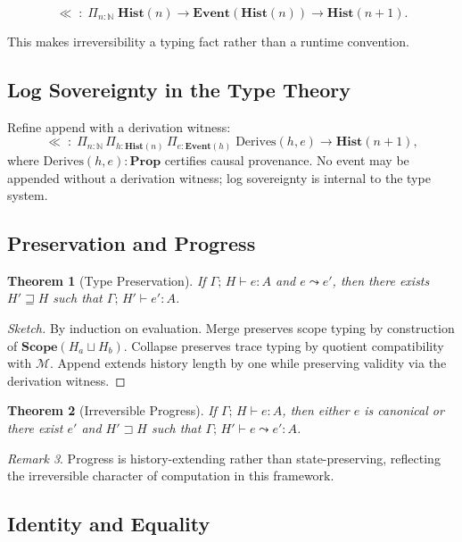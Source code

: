 \documentclass[11pt,a4paper]{article}
\newtheorem{theorem}{Theorem}[section]
\theoremstyle{definition}
\theoremstyle{remark}
\newtheorem{remark}[theorem]{Remark}
\begin{document}
\[
\ll\; :\; \Pi_{n : \mathbb{N}}\; \mathbf{Hist}(n) \to \mathbf{Event}(\mathbf{Hist}(n)) \to \mathbf{Hist}(n+1).
\]

This makes irreversibility a typing fact rather than a runtime convention.

\subsection{Log Sovereignty in the Type Theory}

Refine append with a derivation witness:
\[
\ll\; :\; \Pi_{n:\mathbb{N}}\, \Pi_{h:\mathbf{Hist}(n)}\, \Pi_{e:\mathbf{Event}(h)}\; \mathrm{Derives}(h,e) \to \mathbf{Hist}(n+1),
\]
where $\mathrm{Derives}(h,e) : \mathbf{Prop}$ certifies causal provenance. No event may be appended without a derivation witness; log sovereignty is internal to the type system.

\subsection{Preservation and Progress}

\begin{theorem}[Type Preservation]
If $\Gamma;\, H \vdash e : A$ and $e \leadsto e'$, then there exists $H' \sqsupseteq H$ such that $\Gamma;\, H' \vdash e' : A$.
\end{theorem}

\begin{proof}[Sketch]
By induction on evaluation. Merge preserves scope typing by construction of $\mathbf{Scope}(H_a \sqcup H_b)$. Collapse preserves trace typing by quotient compatibility with $\mathcal{M}$. Append extends history length by one while preserving validity via the derivation witness.
\end{proof}

\begin{theorem}[Irreversible Progress]
If $\Gamma;\, H \vdash e : A$, then either $e$ is canonical or there exist $e'$ and $H' \sqsupset H$ such that $\Gamma;\, H' \vdash e \leadsto e' : A$.
\end{theorem}

\begin{remark}
Progress is history-extending rather than state-preserving, reflecting the irreversible character of computation in this framework.
\end{remark}

\subsection{Identity and Equality}
\end{document}
